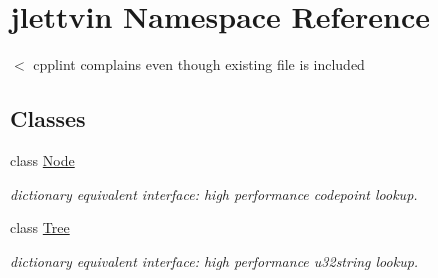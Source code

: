 \hypertarget{namespacejlettvin}{}\section{jlettvin Namespace Reference}
\label{namespacejlettvin}


$<$ cpplint complains even though existing file is included  


\subsection*{Classes}
\begin{DoxyCompactItemize}
\item 
class \hyperlink{classjlettvin_1_1_node}{Node}
\begin{DoxyCompactList}\small\item\em dictionary equivalent interface\+: high performance codepoint lookup. \end{DoxyCompactList}\item 
class \hyperlink{classjlettvin_1_1_tree}{Tree}
\begin{DoxyCompactList}\small\item\em dictionary equivalent interface\+: high performance u32string lookup. \end{DoxyCompactList}\end{DoxyCompactItemize}
